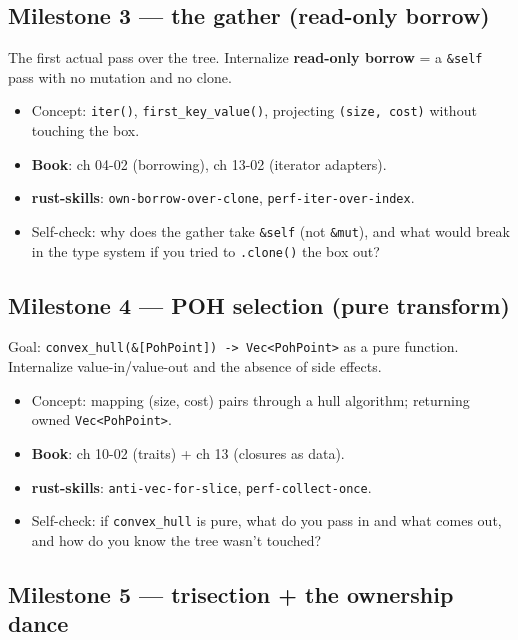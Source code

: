 \documentclass[11pt]{article}
\begin{document}
\subsection{Milestone 3 — the gather (read-only borrow)}
\label{sec:orgc126bce}

The first actual pass over the tree. Internalize \textbf{read-only borrow} = a \texttt{\&self}
pass with no mutation and no clone.

\begin{itemize}
\item Concept: \texttt{iter()}, \texttt{first\_key\_value()}, projecting \texttt{(size, cost)} without
touching the box.
\item \textbf{\textbf{Book}}: ch 04-02 (borrowing), ch 13-02 (iterator adapters).
\item \textbf{\textbf{rust-skills}}: \texttt{own-borrow-over-clone}, \texttt{perf-iter-over-index}.
\item Self-check: why does the gather take \texttt{\&self} (not \texttt{\&mut}), and what would
break in the type system if you tried to \texttt{.clone()} the box out?
\end{itemize}
\subsection{Milestone 4 — POH selection (pure transform)}
\label{sec:org4cbe915}

Goal: \texttt{convex\_hull(\&[PohPoint]) -> Vec<PohPoint>} as a pure function. Internalize
value-in/value-out and the absence of side effects.

\begin{itemize}
\item Concept: mapping (size, cost) pairs through a hull algorithm; returning owned
\texttt{Vec<PohPoint>}.
\item \textbf{\textbf{Book}}: ch 10-02 (traits) + ch 13 (closures as data).
\item \textbf{\textbf{rust-skills}}: \texttt{anti-vec-for-slice}, \texttt{perf-collect-once}.
\item Self-check: if \texttt{convex\_hull} is pure, what do you pass in and what comes out,
and how do you know the tree wasn't touched?
\end{itemize}
\subsection{Milestone 5 — trisection + the ownership dance}
\label{sec:orgf7e9ebd}
\end{document}
